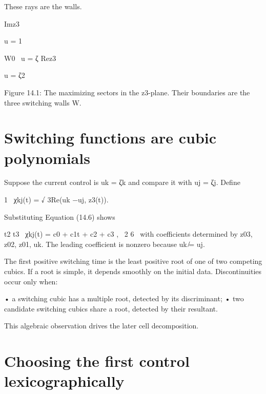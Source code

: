 These rays are the walls.


Imz3


u = 1


\begin{displaytext}
W0 \
u = ζ Rez3
\end{displaytext}

\begin{displaytext}
u = ζ2
\end{displaytext}

\begin{figureplaceholder}
Figure 14.1: The maximizing sectors in the z3-plane. Their boundaries are the three switching walls W.
\end{figureplaceholder}

\section{Switching functions are cubic polynomials}

\begin{displaytext}
Suppose the current control is uk = ζk and compare it with uj = ζj. Define
\end{displaytext}

\begin{displaytext}
1 \
χkj(t) = √ 3Re(uk −uj, z3(t)).
\end{displaytext}

Substituting Equation (14.6) shows


\begin{displaytext}
t2 t3 \
χkj(t) = c0 + c1t + c2 + c3 , \
2 6 \
with coefficients determined by z03, z02, z01, uk. The leading coefficient is nonzero because uk ̸= uj.
\end{displaytext}

The first positive switching time is the least positive root of one of two competing cubics. If a root is simple, it depends smoothly on the initial data. Discontinuities occur only when:


• a switching cubic has a multiple root, detected by its discriminant; • two candidate switching cubics share a root, detected by their resultant.


This algebraic observation drives the later cell decomposition.


\section{Choosing the first control lexicographically}

